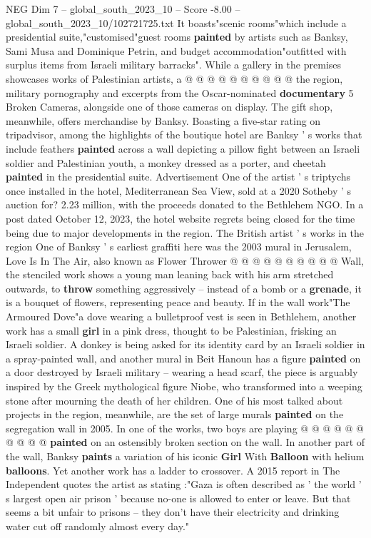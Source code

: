 \begin{textsample}{NEG Dim 7 – global\_south\_2023\_10 – Score -8.00 – global\_south\_2023\_10/102721725.txt}
It boasts"scenic rooms"which include a presidential suite,"customised"guest rooms \textbf{painted} by artists such as Banksy, Sami Musa and Dominique Petrin, and budget accommodation"outfitted with surplus items from Israeli military barracks".
While a gallery in the premises showcases works of Palestinian artists, a @ @ @ @ @ @ @ @ @ @ the region, military pornography and excerpts from the Oscar-nominated \textbf{documentary} 5 Broken Cameras, alongside one of those cameras on display.
The gift shop, meanwhile, offers merchandise by Banksy.
Boasting a five-star rating on tripadvisor, among the highlights of the boutique hotel are Banksy ' s works that include feathers \textbf{painted} across a wall depicting a pillow fight between an Israeli soldier and Palestinian youth, a monkey dressed as a porter, and cheetah \textbf{painted} in the presidential suite.
Advertisement One of the artist ' s triptychs once installed in the hotel, Mediterranean Sea View, sold at a 2020 Sotheby ' s auction for? 2.23 million, with the proceeds donated to the Bethlehem NGO.
In a post dated October 12, 2023, the hotel website regrets being closed for the time being due to major developments in the region.
The British artist ' s works in the region One of Banksy ' s earliest graffiti here was the 2003 mural in Jerusalem, Love Is In The Air, also known as Flower Thrower @ @ @ @ @ @ @ @ @ @ Wall, the stenciled work shows a young man leaning back with his arm stretched outwards, to \textbf{throw} something aggressively -- instead of a bomb or a \textbf{grenade}, it is a bouquet of flowers, representing peace and beauty.
If in the wall work"The Armoured Dove"a dove wearing a bulletproof vest is seen in Bethlehem, another work has a small \textbf{girl} in a pink dress, thought to be Palestinian, frisking an Israeli soldier.
A donkey is being asked for its identity card by an Israeli soldier in a spray-painted wall, and another mural in Beit Hanoun has a figure \textbf{painted} on a door destroyed by Israeli military -- wearing a head scarf, the piece is arguably inspired by the Greek mythological figure Niobe, who transformed into a weeping stone after mourning the death of her children.
One of his most talked about projects in the region, meanwhile, are the set of large murals \textbf{painted} on the segregation wall in 2005.
In one of the works, two boys are playing @ @ @ @ @ @ @ @ @ @ \textbf{painted} on an ostensibly broken section on the wall.
In another part of the wall, Banksy \textbf{paints} a variation of his iconic \textbf{Girl} With \textbf{Balloon} with helium \textbf{balloons}.
Yet another work has a ladder to crossover.
A 2015 report in The Independent quotes the artist as stating :"Gaza is often described as ' the world ' s largest open air prison ' because no-one is allowed to enter or leave.
But that seems a bit unfair to prisons -- they don't have their electricity and drinking water cut off randomly almost every day."

\end{textsample}
